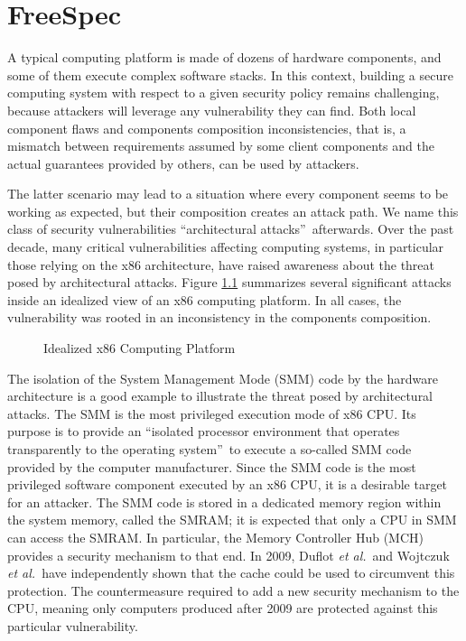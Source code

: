 \chapter{FreeSpec}

A typical computing platform is made of dozens of hardware components, and some
of them execute complex software stacks.
%
In this context, building a secure computing system with respect to a given
security policy remains challenging, because attackers will leverage any
vulnerability they can find.
%
Both local component flaws and components composition inconsistencies,
that is, a mismatch between requirements assumed by some client
components and the actual guarantees provided by others, can be
used by attackers.

The latter scenario may lead to a situation where every component
seems to be working as expected, but their composition creates an
attack path.
%
We name this class of security vulnerabilities ``architectural
attacks''\,\cite{letan2016speccert} afterwards.
%
Over the past decade, many critical vulnerabilities affecting computing systems,
in particular those relying on the x86 architecture, have raised awareness about
the threat posed by architectural attacks.
%
Figure \ref{fig:freespec:computing-platform} summarizes several significant
attacks\,\cite{wojtczuk2009smram,duflot2009smram,domas2015sinkhole,kallenberg2015racecondition,kovah2015senter,stewin2012dma}
inside an idealized view of an x86 computing platform.
%
In all cases, the vulnerability was rooted in an inconsistency in the components
composition.

\begin{figure}
  \centering 
  \caption{Idealized x86 Computing Platform}
  \label{fig:freespec:computing-platform}
\end{figure}

The isolation of the System Management Mode (SMM) code by the hardware
architecture is a good example to illustrate the threat posed by architectural
attacks.
%
The SMM is the most privileged execution mode of x86 CPU.
%
Its purpose is to provide an ``isolated processor environment that operates
transparently to the operating system''\,\cite{intel2014manual} to execute a
so-called SMM code provided by the computer manufacturer.
%
Since the SMM code is the most privileged software component executed by an x86
CPU, it is a desirable target for an attacker.
%
The SMM code is stored in a dedicated memory region within the system memory,
called the SMRAM; it is expected that only a CPU in SMM can access the SMRAM.
%
In particular, the Memory Controller Hub (MCH)\,\cite{intel2009mch} provides a
security mechanism to that end.
%
In 2009, Duflot \emph{et al.}\,\cite{duflot2009smram} and Wojtczuk \emph{et
al.}\,\cite{wojtczuk2009smram} have independently shown that the cache could be
used to circumvent this protection.
%
The countermeasure required to add a new security mechanism to the CPU, meaning
only computers produced after 2009 are protected against this particular
vulnerability.

